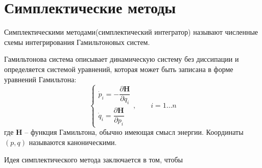 \section{Симплектические методы}
Симплектическими методами(симплектический интегратор)
называют численные схемы интегрирования Гамильтоновых систем.

Гамильтонова система описывает динамическую систему без диссипации и
определяется системой уравнений, которая может быть записана в форме уравнений
Гамильтона:
\begin{equation}
    \begin{cases}
        \dot p_i = -\dfrac{\partial \mathbf H}{\partial q_i}\\
        \dot q_i = \dfrac{\partial \mathbf H}{\partial p_i}
    \end{cases},
    \qquad i = 1\dots n
\end{equation}
где $\mathbf H$ -- функция Гамильтона, обычно имеющая смысл энергии. Координаты
$(p, q)$ называются каноническими.

Идея симплектического метода заключается в том, чтобы 
